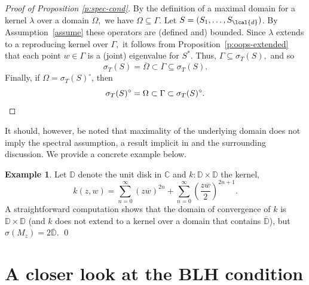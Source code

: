 \documentclass[a4paper,reqno,index]{amsart}
\newcommand{\df}[1]{{\textit{#1}}{\index{#1}}}
\numberwithin{equation}{section}
\newcommand{\DD}{\mathbb{D}}
\newcommand{\CC}{\mathbb{C}}
\newcommand{\specT}{\sigma_T}  %
\newcommand{\genl}{\lambda} %
\newcommand{\ol}[1]{\overline{#1}}
\theoremstyle{definition}
\newtheorem{example}[theorem]{Example}
\begin{document}
 
 \begin{proof}[Proof of Proposition \ref{p:spec-cond}]
   By the definition of a maximal domain for a kernel $\genl$
   over a domain $\Omega,$ we have $\Omega\subseteq \Gamma.$
   Let $S=(S_1,\dots,S_\lcal{d})$.
   By Assumption~\ref{assume} these operators are (defined and)  bounded.  
    Since $\genl$ extends to a reproducing kernel over $\Gamma,$ it follows from Proposition~\ref{p:oops-extended} that each point $w\in \Gamma$ is
    a (joint) eigenvalue for $S^*.$ Thus, $\Gamma\subseteq \specT(S),$  and so 
\[
  \specT(S) = \ol{\Omega} \subset \ol{\Gamma} \subseteq \specT(S) . 
\]
Finally, if $\Omega =\specT(S)^\circ$, then 
\[
  \specT(S)^\circ=\Omega\subset\Gamma\subset \specT(S)^{\circ}. \qedhere
\]
 \end{proof}



It should, however, be noted that maximality of the underlying domain does not  imply the spectral assumption,
a result implicit in \cite[Theorem~8]{Shields} and the surrounding discussion.
We provide a concrete example below. 



\begin{example}\rm
 \label{eg:spec-not-omega}
    Let \df{$\DD$} denote the unit disk in $\CC$ and $k:\DD\times \DD$ the kernel,
\[
 k(z,w)= \sum_{n=0}^\infty (z\overline{w})^{2n} + \sum_{n=0}^\infty \left ( \frac{z\overline{w}}{2}\right)^{2n+1}.
\]
 A straightforward computation shows that the domain of convergence of $k$ is $\DD\times \DD$ (and $k$ does not
 extend to a kernel over a domain that contains $\overline{\DD}$), but $\sigma(M_z)= 2\overline{\DD}.$
 \qed
\end{example}


\section{A closer look at the BLH condition} 
\label{s:moreBLH}
\end{document}
